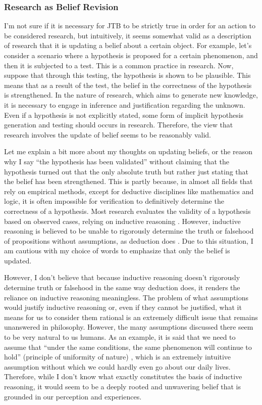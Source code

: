 \documentclass{book}
\begin{document}
\subsubsection{Research as Belief Revision}
I'm not sure if it is necessary for JTB to be strictly true in order for an action to be considered research, but intuitively, it seems somewhat valid as a description of research that it is updating a belief about a certain object. For example, let's consider a scenario where a hypothesis is proposed for a certain phenomenon, and then it is subjected to a test. This is a common practice in research. Now, suppose that through this testing, the hypothesis is shown to be plausible. This means that as a result of the test, the belief in the correctness of the hypothesis is strengthened. In the nature of research, which aims to generate new knowledge, it is necessary to engage in inference and justification regarding the unknown. Even if a hypothesis is not explicitly stated, some form of implicit hypothesis generation and testing should occurs in research. Therefore, the view that research involves the update of belief seems to be reasonably valid.

Let me explain a bit more about my thoughts on updating beliefs, or the reason why I say ``the hypothesis has been validated'' without claiming that the hypothesis turned out that the only absolute truth but rather just stating that the belief has been strengthened. This is partly because, in almost all fields that rely on empirical methods, except for deductive disciplines like mathematics and logic, it is often impossible for verification to definitively determine the correctness of a hypothesis. Most research evaluates the validity of a hypothesis based on observed cases, relying on inductive reasoning \cite{sep-scientific-method}. However, inductive reasoning is believed to be unable to rigorously determine the truth or falsehood of propositions without assumptions, as deduction does \cite{sep-induction-problem}. Due to this situation, I am cautious with my choice of words to emphasize that only the belief is updated.

However, I don't believe that because inductive reasoning doesn't rigorously determine truth or falsehood in the same way deduction does, it renders the reliance on inductive reasoning meaningless. The problem of what assumptions would justify inductive reasoning or, even if they cannot be justified, what it means for us to consider them rational is an extremely difficult issue that remains unanswered in philosophy. However, the many assumptions discussed there seem to be very natural to us humans. As an example, it is said that we need to assume that ``under the same conditions, the same phenomenon will continue to hold'' (principle of uniformity of nature) \cite{sep-induction-problem}, which is an extremely intuitive assumption without which we could hardly even go about our daily lives. Therefore, while I don't know what exactly constitutes the basis of inductive reasoning, it would seem to be a deeply rooted and unwavering belief that is grounded in our perception and experiences.
\end{document}
